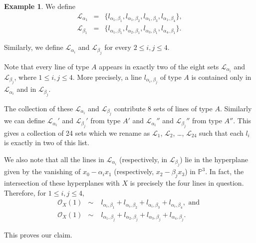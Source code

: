 \documentclass[12pt,reqno]{amsart}
\theoremstyle{plain}
\numberwithin{equation}{section}
\theoremstyle{definition}
\newtheorem{example}[theorem]{Example}
\begin{document}
\begin{example}
 We define  
 \begin{eqnarray*} 
 \mathcal{L}_{\alpha_1} &=&\{l_{\alpha_1,\beta_1},l_{\alpha_1,\beta_2},l_{\alpha_1,\beta_3},l_{\alpha_1,\beta_4} \},\\ 
\mathcal{L}_{\beta_1} &=& \{l_{\alpha_1,\beta_1},l_{\alpha_2,\beta_1},l_{\alpha_3,\beta_1},l_{\alpha_4,\beta_1} \}.
\end{eqnarray*}

Similarly, we define $\mathcal{L}_{\alpha_i}$ and  $\mathcal{L}_{\beta_j}$ for every 
$2 \le i, j \le 4$. 

Note that every line of type $A$ appears in exactly two of the eight sets 
$\mathcal{L}_{\alpha_i}$ and  $\mathcal{L}_{\beta_j}$, where $1\le i, j \le 4$. 
More precisely,  a line $l_{\alpha_i,\beta_j}$ of type $A$ is contained only  in $\mathcal{L}_{\alpha_i}$ and in $ \mathcal{L}_{\beta_j}$. 

		
		

The collection of these $\mathcal{L}_{\alpha_i}$ and $\mathcal{L}_{\beta_j}$ contribute $8$ sets of lines of type $A$. 
		Similarly we can define $\mathcal{L}_{\alpha_i}'$ and $\mathcal{L}_{\beta_j}'$ from type $A'$ and $\mathcal{L}_{\alpha_i}''$ and $\mathcal{L}_{\beta_j}''$ from type $A''$. This gives a collection of 24 sets which we rename 
		as $\mathcal{L}_1$, $\mathcal{L}_2$, \ldots, $\mathcal{L}_{24}$ such that each $l_i$ is exactly in two of this list. 		

		We also note that all the lines in $\mathcal{L}_{\alpha_i}$ (respectively, in $\mathcal{L}_{\beta_j}$) lie
		in the hyperplane given by the vanishing of $x_0 - \alpha_i x_1$ (respectively, $x_2 - \beta_j x_3$) in $\mathbb{P}^3$. In fact, the intersection of these hyperplanes with $X$ is precisely the four lines in question. 
		Therefore, for $1 \le i, j \le 4$, 
		\begin{eqnarray*}
		\mathcal{O}_X(1) &\sim&  \; l_{\alpha_i,\beta_1} + l_{\alpha_i,\beta_2} + l_{\alpha_i,\beta_3} + l_{\alpha_i,\beta_4}, \text{ and } \\
		\mathcal{O}_X(1) &\sim& \;  l_{\alpha_1,\beta_j} + l_{\alpha_2,\beta_j} + l_{\alpha_3,\beta_j} + l_{\alpha_4,\beta_j}.
		\end{eqnarray*}
		
This proves our claim. 
		

\end{example}
\end{document}
